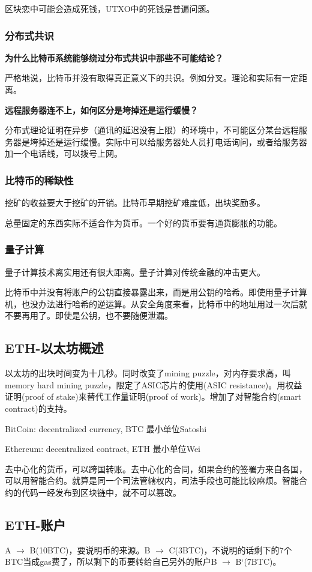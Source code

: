 \documentclass[10pt]{ctexart}
\begin{document}
区块恋中可能会造成死钱，UTXO中的死钱是普遍问题。
\subsubsection{分布式共识}
\textbf{为什么比特币系统能够绕过分布式共识中那些不可能结论？}

严格地说，比特币并没有取得真正意义下的共识。例如分叉。理论和实际有一定距离。

\textbf{远程服务器连不上，如何区分是垮掉还是运行缓慢？}

分布式理论证明在异步（通讯的延迟没有上限）的环境中，不可能区分某台远程服务器是垮掉还是运行缓慢。实际中可以给服务器处人员打电话询问，或者给服务器加一个电话线，可以拨号上网。

\subsubsection{比特币的稀缺性}
挖矿的收益要大于挖矿的开销。比特币早期挖矿难度低，出块奖励多。

总量固定的东西实际不适合作为货币。一个好的货币要有通货膨胀的功能。

\subsubsection{量子计算}
量子计算技术离实用还有很大距离。量子计算对传统金融的冲击更大。

比特币中并没有将账户的公钥直接暴露出来，而是用公钥的哈希。即使用量子计算机，也没办法进行哈希的逆运算。从安全角度来看，比特币中的地址用过一次后就不要再用了。即使是公钥，也不要随便泄漏。

\subsection{ETH-以太坊概述}
以太坊的出块时间变为十几秒。同时改变了mining puzzle，对内存要求高，叫memory hard mining puzzle，限定了ASIC芯片的使用(ASIC resistance)。用权益证明(proof of stake)来替代工作量证明(proof of work)。增加了对智能合约(smart contract)的支持。

BitCoin: decentralized currency, BTC 最小单位Satoshi

Ethereum: decentralized contract, ETH 最小单位Wei

去中心化的货币，可以跨国转账。去中心化的合同，如果合约的签署方来自各国，可以用智能合约。就算是同一个司法管辖权内，司法手段也可能比较麻烦。智能合约的代码一经发布到区块链中，就不可以篡改。

\subsection{ETH-账户}
A $\rightarrow$ B(10BTC)，要说明币的来源。B $\rightarrow$ C(3BTC)，不说明的话剩下的7个BTC当成gas费了，所以剩下的币要转给自己另外的账户B $\rightarrow$ B‘(7BTC)。
\end{document}

